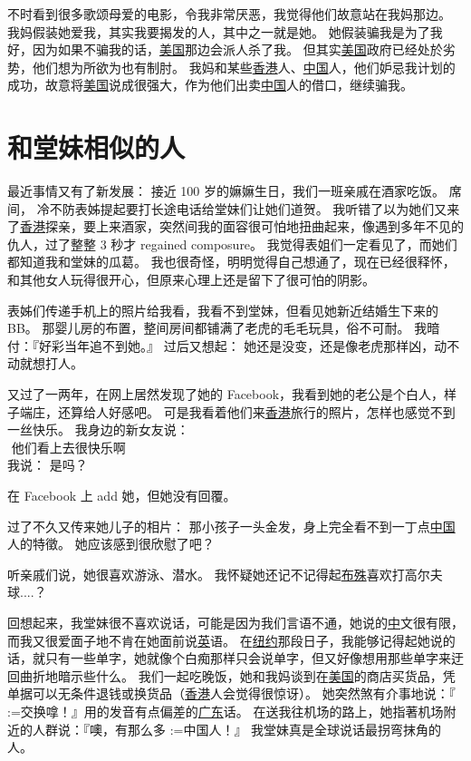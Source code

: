 \documentclass[12pt]{report}
\makeatletter
\newcommand{\tab}{\hspace*{1cm}}
\renewcommand{\d}[1]{$\underaccent{\scalebox{0.5}{\textbullet}}{\textrm{#1}}$}
\newcommand{\ds}[1]{%
  \@tfor\next:=#1\do{\d{\next}}}
\newcommand*\dashh{\textemdash\,\,}
\makeatother
\begin{document}
{不时看到很多歌颂母爱的电影，令我非常厌恶，我觉得他们故意站在我妈那边。 我妈假装她爱我，其实我要揭发的人，其中之一就是她。  她假装骗我是为了我好，因为如果不骗我的话，\uline{美国}那边会派人杀了我。 但其实\uline{美国}政府已经处於劣势，他们想为所欲为也有制肘。 我妈和某些\uline{香港}人、\uline{中国}人，他们妒忌我计划的成功，故意将\uline{美国}说成很强大，作为他们出卖\uline{中国}人的借口，继续骗我。

\chapter{和堂妹相似的人}

最近事情又有了新发展：  接近 100 岁的嫲嫲生日，我们一班亲戚在酒家吃饭。  席间， 冷不防表姊提起要打长途电话给堂妹们让她们道贺。  我听错了以为她们又来了\uline{香港}探亲，要上来酒家，突然间我的面容很可怕地扭曲起来，像遇到多年不见的仇人，过了整整 3 秒才 regained composure。 我觉得表姐们一定看见了，而她们都知道我和堂妹的瓜葛。  我也很奇怪，明明觉得自己想通了，现在已经很释怀，和其他女人玩得很开心，但原来心理上还是留下了很可怕的阴影。

表姊们传递手机上的照片给我看，我看不到堂妹，但看见她新近结婚生下来的BB。 那婴儿房的布置，整间房间都铺满了老虎的毛毛玩具，俗不可耐。 我暗付：『好彩当年追不到她。』  过后又想起： 她还是没变，还是像老虎那样凶，动不动就想打人。

又过了一两年，在网上居然发现了她的 Facebook，我看到她的老公是个白人，样子端庄，还算给人好感吧。 可是我看着他们来\uline{香港}旅行的照片，怎样也感觉不到一丝快乐。 我身边的新女友说：\\
\tab \dashh 他们看上去很快乐啊 \\
\tab 我说： 是吗？

在 Facebook 上 add 她，但她没有回覆。

过了不久又传来她儿子的相片： 那小孩子一头金发，身上完全看不到一丁点\uline{中国}人的特徵。 她应该感到很欣慰了吧？

听亲戚们说，她很喜欢游泳、潜水。  我怀疑她还记不记得起\uline{布殊}喜欢打高尔夫球....？

回想起来，我堂妹很不喜欢说话，可能是因为我们言语不通，她说的\uline{中}文很有限，而我又很爱面子地不肯在她面前说\uline{英}语。 在\uline{纽约}那段日子，我能够记得起她说的话，就只有一些单字，她就像个白痴那样只会说单字，但又好像想用那些单字来迂回曲折地暗示些什么。 我们一起吃晚饭，她和我妈谈到在\uline{美国}的商店买货品，凭单据可以无条件退钱或换货品（\uline{香港}人会觉得很惊讶）。 她突然煞有介事地说：『\ds{交换}嗱！』用的发音有点偏差的\uline{广东}话。 在送我往机场的路上，她指著机场附近的人群说：『噢，有那么多\ds{中国人}！』  我堂妹真是全球说话最拐弯抹角的人。

}
\end{document}
